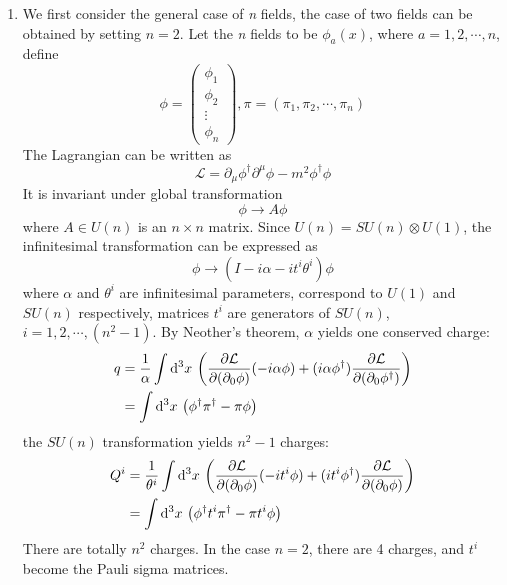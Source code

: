 \begin{enumerate}[label = {(\alph*)}]
    \item We first consider the general case of \textit{n} fields, the case of two fields can be obtained by setting $n = 2$. Let the \textit{n} fields to be 
    $\phi_a(x)$, where $a = 1, 2, \cdots, n$, define
    \begin{equation*}
        \phi = \begin{pmatrix}
            \phi_1\\
            \phi_2\\
            \vdots\\
            \phi_n
        \end{pmatrix},
        \pi = \left(\pi_1, \pi_2, \cdots, \pi_n\right)
    \end{equation*}
    The Lagrangian can be written as 
    \begin{equation}\label{equ:cp2:csf_nf_lag}
        \mathcal{L} = \partial_\mu \phi^\dagger \partial^\mu \phi - m^2 \phi^\dagger \phi
    \end{equation}
    It is invariant under global transformation
    \begin{equation*}
        \phi \to A \phi
    \end{equation*}
    where $A \in U(n)$ is an $n \times n$ matrix. Since $U(n) = SU(n) \otimes U(1)$, the infinitesimal transformation can be expressed as
    \begin{equation*}
        \phi \to (I - i\alpha - i t^i \theta^i)\phi
    \end{equation*}
    where $\alpha$ and $\theta^i$ are infinitesimal parameters, correspond to $U(1)$ and $SU(n)$ respectively, 
    matrices $t^i$ are generators of $SU(n)$, $i = 1, 2, \cdots, (n^2 - 1)$. By Neother's theorem, 
    $\alpha$ yields one conserved charge:
    \begin{align*}
        q & = \frac{1}{\alpha}\int \mathrm{d}^3x \, \left(\frac{\partial \mathcal{L}}{\partial (\partial_0\phi)}(-i\alpha\phi) + (i\alpha\phi^\dagger)\frac{\partial \mathcal{L}}{\partial (\partial_0\phi^\dagger)}\right)\\
        & = \int \mathrm{d}^3x \, \left(\phi^\dagger \pi^\dagger - \pi\phi\right)
    \end{align*}
    the $SU(n)$ transformation yields $n^2 - 1$ charges:
    \begin{align*}
        Q^i & = \frac{1}{\theta^i}\int \mathrm{d}^3x \, \left(\frac{\partial \mathcal{L}}{\partial (\partial_0\phi)} (-it^i\phi) + (it^i \phi^\dagger)\frac{\partial \mathcal{L}}{\partial (\partial_0\phi)} \right)\\
        & = \int \mathrm{d}^3x \, \left(\phi^\dagger t^i \pi^\dagger - \pi t^i \phi\right)
    \end{align*}
    There are totally $n^2$ charges. In the case $n = 2$, there are 4 charges, and $t^i$ become the Pauli sigma matrices.
\end{enumerate}


